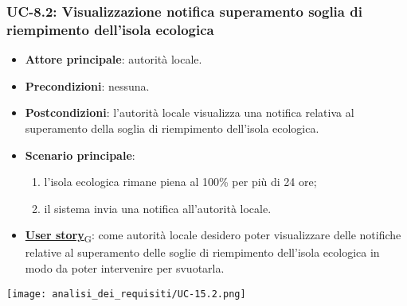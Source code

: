 \subsubsection{UC-8.2: Visualizzazione notifica superamento soglia di riempimento dell'isola ecologica}
\begin{itemize}
	\item \textbf{Attore principale}: autorità locale.
	\item \textbf{Precondizioni}: nessuna.
	\item \textbf{Postcondizioni}: l'autorità locale visualizza una notifica relativa al superamento della soglia di riempimento dell'isola ecologica.
	\item \textbf{Scenario principale}:
	      \begin{enumerate}
		      \item l'isola ecologica rimane piena al 100\% per più di 24 ore;
		      \item il sistema invia una notifica all'autorità locale.
	      \end{enumerate}
	\item \href{https://7last.github.io/docs/rtb/documentazione-interna/glossario\#user-story}{\textbf{User story}\textsubscript{G}}:
	      come autorità locale desidero poter visualizzare delle notifiche relative al superamento delle soglie di riempimento dell'isola ecologica
	      in modo da poter intervenire per svuotarla.
\end{itemize}
\begin{center}
	\texttt{[image: analisi\_dei\_requisiti/UC-15.2.png]}
\end{center}

